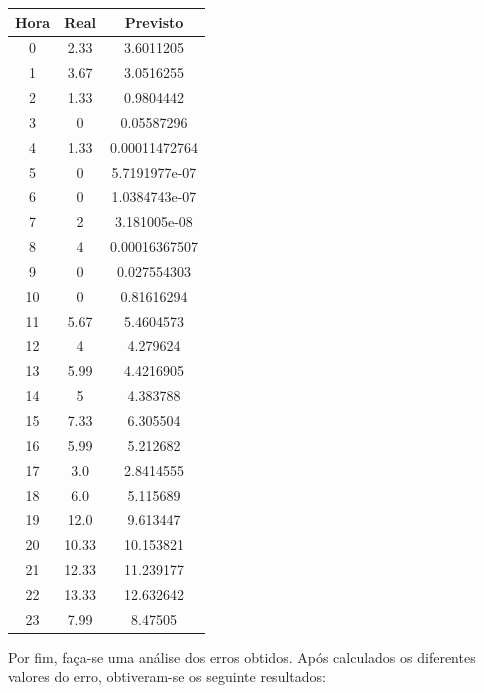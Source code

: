 \documentclass[a4paper, 12pt]{article}
\begin{document}
\begin{table}[H]
	\centering
	\begin{tabular}{||c||c|c||}
		\hline\hline
		Hora & Real&Previsto\\
		\hline\hline
		0 & 
2.33
 &3.6011205 \\
		\hline
		1  &
3.67 &3.0516255 \\
		\hline
		2 &  1.33& 0.9804442	\\
		\hline
		3  & 
0
 &0.05587296 \\
		\hline
		4 & 1.33
 &0.00011472764 \\
		\hline
		5  & 
0 &5.7191977e-07 \\
		\hline
		6 & 
0
 & 

1.0384743e-07 \\
		\hline
		7 & 
2
 & 3.181005e-08\\
		\hline
		8  &
4 & 0.00016367507\\
		\hline
		9 &  0& 0.027554303	\\
		\hline
		10 & 
0
 & 0.81616294\\
		\hline
		11  &
5.67 & 5.4604573\\
		\hline
		12 & 4 & 4.279624	\\
		\hline
		13  & 5.99

 &4.4216905 \\
		\hline
		14 & 
5 &4.383788 \\
		\hline
		15  & 7.33
 & 6.305504 \\
		\hline
		16 & 
5.99
 & 
5.212682
 \\
		\hline
		17 & 
3.0
 & 2.8414555\\
		\hline
		18  &
6.0 & 5.115689\\
		\hline
		19 & 12.0 & 9.613447	\\
		\hline
		20 & 
 10.33
 &10.153821 \\
		\hline
		21  &
12.33 &11.239177 \\
		\hline
		22 & 13.33 & 12.632642	\\
		\hline
		23  & 
7.99
 & 8.47505\\
		\hline\hline
	\end{tabular}
\end{table}

Por fim, faça-se uma análise dos erros obtidos. Após calculados os diferentes valores do erro, obtiveram-se os seguinte resultados:
\end{document}
